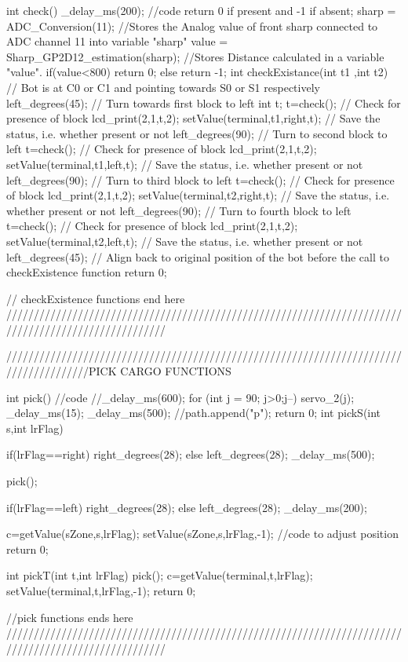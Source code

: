 int check()
{
    _delay_ms(200);
	//code return 0 if present and -1 if absent;
	sharp = ADC_Conversion(11);						//Stores the Analog value of front sharp connected to ADC channel 11 into variable "sharp"
	value = Sharp_GP2D12_estimation(sharp);            //Stores Distance calculated in a variable "value".
	if(value<800)
		return 0;
	else
		return -1;
}
int checkExistance(int t1 ,int t2)
{   // Bot is at C0 or C1 and pointing towards S0 or S1 respectively
	left_degrees(45); // Turn towards first block to left
	int t;
	t=check(); // Check for presence of block 
	lcd_print(2,1,t,2);
    setValue(terminal,t1,right,t); // Save the status, i.e. whether present or not 
    left_degrees(90); // Turn to second block to left
    t=check(); // Check for presence of block
    lcd_print(2,1,t,2);
	setValue(terminal,t1,left,t); // Save the status, i.e. whether present or not
    left_degrees(90); // Turn to third block to left
    t=check(); // Check for presence of block
	lcd_print(2,1,t,2);
    setValue(terminal,t2,right,t); // Save the status, i.e. whether present or not
    left_degrees(90); // Turn to fourth block to left
    t=check(); // Check for presence of block
	lcd_print(2,1,t,2);
    setValue(terminal,t2,left,t); // Save the status, i.e. whether present or not
    left_degrees(45); // Align back to original position of the bot before the call to checkExistence function
	return 0;
}

// checkExistence functions end here
/////////////////////////////////////////////////////////////////////////////////////////////////////


///////////////////////////////////////////////////////////////////////////////////////PICK CARGO FUNCTIONS

int pick()
{
    //code
	//_delay_ms(600);
	for (int j = 90; j>0;j--)
	{ servo_2(j);
		_delay_ms(15);
	}
	_delay_ms(500);
	//path.append("p");
    return 0;
}
int pickS(int s,int lrFlag)
{
    if(lrFlag==right)
	    right_degrees(28);
	else
	    left_degrees(28);
 	_delay_ms(500);

    pick();
	
	if(lrFlag==left)
	right_degrees(28);
	else
	left_degrees(28);
	_delay_ms(200);

    c=getValue(sZone,s,lrFlag);
    setValue(sZone,s,lrFlag,-1);
    //code to adjust position
	return 0;
}
int pickT(int t,int lrFlag)
{
    pick();
    c=getValue(terminal,t,lrFlag);
    setValue(terminal,t,lrFlag,-1);
	return 0;
}

//pick functions ends here
/////////////////////////////////////////////////////////////////////////////////////////////////////


